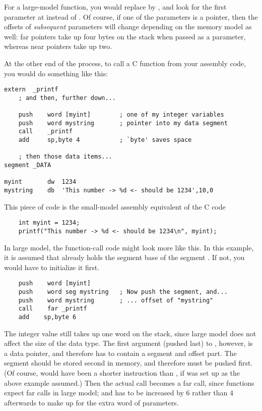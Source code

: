 For a large-model function, you would replace  by ,
and look for the first parameter at \code{[BP+6]} instead of
\code{[BP+4]}. Of course, if one of the parameters is a pointer, then
the offsets of \emph{subsequent} parameters will change depending on
the memory model as well: far pointers take up four bytes on the
stack when passed as a parameter, whereas near pointers take up two.

At the other end of the process, to call a C function from your
assembly code, you would do something like this:

\begin{lstlisting}
extern  _printf
    ; and then, further down...

    push    word [myint]        ; one of my integer variables
    push    word mystring       ; pointer into my data segment
    call    _printf
    add     sp,byte 4           ; `byte' saves space

    ; then those data items...
segment _DATA

myint       dw  1234
mystring    db  'This number -> %d <- should be 1234',10,0
\end{lstlisting}

This piece of code is the small-model assembly equivalent of the C
code

\begin{lstlisting}
    int myint = 1234;
    printf("This number -> %d <- should be 1234\n", myint);
\end{lstlisting}

In large model, the function-call code might look more like this. In
this example, it is assumed that  already holds the segment
base of the segment . If not, you would have to initialize
it first.

\begin{lstlisting}
    push    word [myint]
    push    word seg mystring   ; Now push the segment, and...
    push    word mystring       ; ... offset of "mystring"
    call    far _printf
    add    sp,byte 6
\end{lstlisting}

The integer value still takes up one word on the stack, since large
model does not affect the size of the  data type. The first
argument (pushed last) to , however, is a data pointer,
and therefore has to contain a segment and offset part. The segment
should be stored second in memory, and therefore must be pushed
first. (Of course,  would have been a shorter instruction
than , if  was set up as the above
example assumed.) Then the actual call becomes a far call, since
functions expect far calls in large model; and  has to be
increased by 6 rather than 4 afterwards to make up for the extra
word of parameters.

